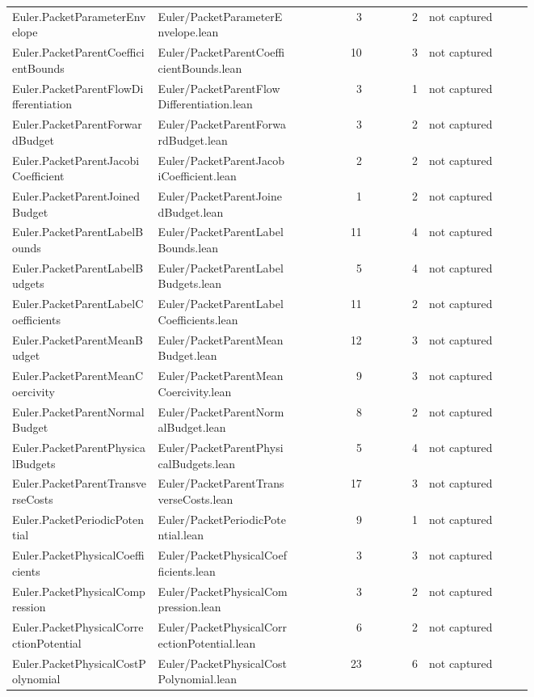 \documentclass[10pt]{article}
\begin{document}
\begin{longtable}{p{0.28\linewidth}p{0.27\linewidth}r r p{0.20\linewidth}}
Euler.PacketParameterEnvelope & Euler/PacketParameterEnvelope.lean & 3 & 2 & not captured\\
Euler.PacketParentCoefficientBounds & Euler/PacketParentCoefficientBounds.lean & 10 & 3 & not captured\\
Euler.PacketParentFlowDifferentiation & Euler/PacketParentFlowDifferentiation.lean & 3 & 1 & not captured\\
Euler.PacketParentForwardBudget & Euler/PacketParentForwardBudget.lean & 3 & 2 & not captured\\
Euler.PacketParentJacobiCoefficient & Euler/PacketParentJacobiCoefficient.lean & 2 & 2 & not captured\\
Euler.PacketParentJoinedBudget & Euler/PacketParentJoinedBudget.lean & 1 & 2 & not captured\\
Euler.PacketParentLabelBounds & Euler/PacketParentLabelBounds.lean & 11 & 4 & not captured\\
Euler.PacketParentLabelBudgets & Euler/PacketParentLabelBudgets.lean & 5 & 4 & not captured\\
Euler.PacketParentLabelCoefficients & Euler/PacketParentLabelCoefficients.lean & 11 & 2 & not captured\\
Euler.PacketParentMeanBudget & Euler/PacketParentMeanBudget.lean & 12 & 3 & not captured\\
Euler.PacketParentMeanCoercivity & Euler/PacketParentMeanCoercivity.lean & 9 & 3 & not captured\\
Euler.PacketParentNormalBudget & Euler/PacketParentNormalBudget.lean & 8 & 2 & not captured\\
Euler.PacketParentPhysicalBudgets & Euler/PacketParentPhysicalBudgets.lean & 5 & 4 & not captured\\
Euler.PacketParentTransverseCosts & Euler/PacketParentTransverseCosts.lean & 17 & 3 & not captured\\
Euler.PacketPeriodicPotential & Euler/PacketPeriodicPotential.lean & 9 & 1 & not captured\\
Euler.PacketPhysicalCoefficients & Euler/PacketPhysicalCoefficients.lean & 3 & 3 & not captured\\
Euler.PacketPhysicalCompression & Euler/PacketPhysicalCompression.lean & 3 & 2 & not captured\\
Euler.PacketPhysicalCorrectionPotential & Euler/PacketPhysicalCorrectionPotential.lean & 6 & 2 & not captured\\
Euler.PacketPhysicalCostPolynomial & Euler/PacketPhysicalCostPolynomial.lean & 23 & 6 & not captured\\

\end{longtable}
\end{document}
